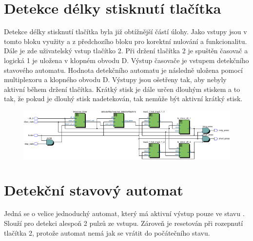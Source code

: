 \documentclass[FM,ZP]{tulthesis}
\begin{document}
	\section{Detekce délky stisknutí tlačítka}
	Detekce délky stisknutí tlačítka byla již obtížnější částí úlohy. Jako vstupy jsou v tomto bloku využity  a  z předchozího bloku pro korektní nulování a funkcionalitu. Dále je zde uživatelský vstup tlačítko 2. Při držení tlačítka 2 je spuštěn časovač a logická 1 je uložena v klopném obvodu D. Výstup časovače je vstupem detekčního stavového automatu. Hodnota detekčního automatu je následně uložena pomocí multiplexoru a klopného obvodu D. Výstupy jsou ošetřeny tak, aby nebyly aktivní během držení tlačítka. Krátký stisk je dále určen dlouhým stiskem a to tak, že pokud je dlouhý stisk nadetekován, tak nemůže být aktivní krátký stisk.
	
	\begin{figure}[h]
		\centering
		\includegraphics[clip,width=1\textwidth]{hold_detector.pdf}
	\end{figure}

	\section{Detekční stavový automat}
	Jedná se o velice jednoduchý automat, který má aktivní výstup pouze ve stavu . Slouží pro detekci alespoň 2 pulzů ze vstupu. Zároveň je resetován při rozepnutí tlačítka 2, protože automat nemá jak se vrátit do počátečního stavu.
\end{document}
